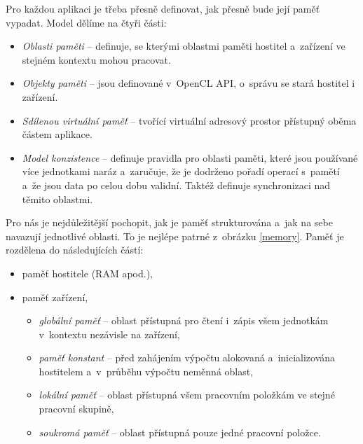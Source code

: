  Pro každou aplikaci je třeba přesně definovat, jak přesně bude její paměť vypadat.
Model dělíme na čtyři části:
\begin{itemize}
    \item {\it Oblasti paměti} -- definuje, se kterými oblastmi paměti hostitel a~zařízení ve
	stejném kontextu mohou pracovat.
    \item {\it Objekty paměti} -- jsou definované v~OpenCL API, o~správu se stará hostitel i
	zařízení.
    \item {\it Sdílenou virtuální paměť} -- tvořící virtuální adresový prostor přístupný oběma
	částem aplikace.
    \item {\it Model konzistence} -- definuje pravidla pro oblasti paměti, které jsou používané
	více jednotkami naráz a~zaručuje, že je dodrženo pořadí operací s~pamětí a~že jsou data po
	celou dobu validní. Taktéž definuje synchronizaci nad těmito oblastmi.
\end{itemize}
Pro nás je nejdůležitější pochopit, jak je paměť strukturována a~jak na sebe navazují
jednotlivé oblasti. To je nejlépe patrné z~obrázku \ref{memory}. Paměť je rozdělena do následujících
částí:
\begin{itemize}
    \item paměť hostitele (RAM apod.),
    \item paměť zařízení,
    \begin{itemize}
	\item {\it globální paměť} -- oblast přístupná pro čtení i~zápis všem jednotkám
	    v~kontextu nezávisle na zařízení,
	\item {\it paměť konstant} -- před zahájením výpočtu alokovaná a~inicializována
	    hostitelem a~v~průběhu výpočtu neměnná oblast,
	\item {\it lokální paměť} -- oblast přístupná všem pracovním položkám ve stejné pracovní
	    skupině,
	\item {\it soukromá paměť} -- oblast přístupná pouze jedné pracovní položce.
    \end{itemize}
\end{itemize}
